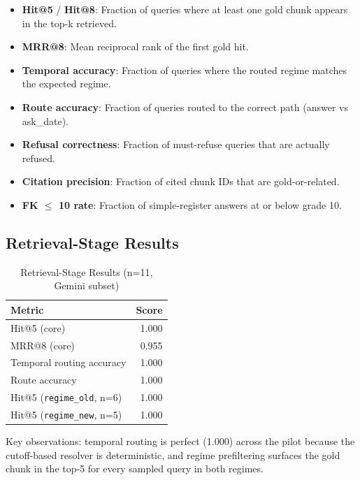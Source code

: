 \documentclass[conference]{IEEEtran}
\begin{document}
\begin{itemize}
    \item \textbf{Hit@5} / \textbf{Hit@8}: Fraction of queries where at least one gold chunk appears in the top-k retrieved.
    \item \textbf{MRR@8}: Mean reciprocal rank of the first gold hit.
    \item \textbf{Temporal accuracy}: Fraction of queries where the routed regime matches the expected regime.
    \item \textbf{Route accuracy}: Fraction of queries routed to the correct path (answer vs ask\_date).
    \item \textbf{Refusal correctness}: Fraction of must-refuse queries that are actually refused.
    \item \textbf{Citation precision}: Fraction of cited chunk IDs that are gold-or-related.
    \item \textbf{FK $\leq$ 10 rate}: Fraction of simple-register answers at or below grade 10.
\end{itemize}

\subsection{Retrieval-Stage Results}

\begin{table}[h]
\centering
\caption{Retrieval-Stage Results (n=11, Gemini subset)}
\label{tab:retrieval}
\begin{tabular}{@{}lr@{}}
\toprule
\textbf{Metric} & \textbf{Score} \\
\midrule
Hit@5 (core) & 1.000 \\
MRR@8 (core) & 0.955 \\
Temporal routing accuracy & 1.000 \\
Route accuracy & 1.000 \\
Hit@5 (\texttt{regime\_old}, n=6) & 1.000 \\
Hit@5 (\texttt{regime\_new}, n=5) & 1.000 \\
\bottomrule
\end{tabular}
\end{table}

Key observations: temporal routing is perfect (1.000) across the pilot because the cutoff-based resolver is deterministic, and regime prefiltering surfaces the gold chunk in the top-5 for every sampled query in both regimes. %
\end{document}

